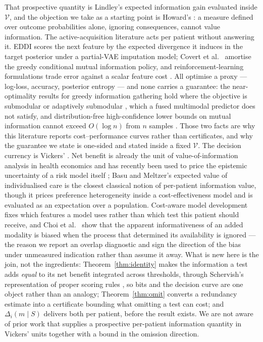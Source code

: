 \documentclass[11pt]{article}
\theoremstyle{definition}
\theoremstyle{remark}
\newcommand{\Vc}{\mathcal{V}}
\begin{document}
That prospective quantity is Lindley's expected information gain
\citep{lindley1956measure,chaloner1995bayesian} evaluated inside $\Vc$, and the
objection we take as a starting point is Howard's \citep{howard1966ivt}: a
measure defined over outcome probabilities alone, ignoring consequences, cannot
value information. The active-acquisition literature acts per patient without
answering it. EDDI \citep{ma2019eddi} scores the next feature by the expected
divergence it induces in the target posterior under a partial-VAE imputation
model; Covert et al.\ \citep{covert2023dfs} amortise the greedy conditional
mutual information policy, and reinforcement-learning formulations trade error
against a scalar feature cost \citep{janisch2019costly}. All optimise a proxy ---
log-loss, accuracy, posterior entropy --- and none carries a guarantee: the
near-optimality results for greedy information gathering hold where the objective
is submodular or adaptively submodular \citep{krause2005nearoptimal,
golovin2011adaptive}, which a fused multimodal predictor does not satisfy, and
distribution-free high-confidence lower bounds on mutual information cannot
exceed $O(\log n)$ from $n$ samples \citep{mcallester2020limitations}. Those two
facts are why this literature reports cost--performance curves rather than
certificates, and why the guarantee we state is one-sided and stated inside a
fixed $\Vc$. The decision currency is Vickers' \citep{vickers2006decision}. Net
benefit is already the unit of value-of-information analysis in health economics
\citep{ades2004evsi} and has recently been used to price the epistemic
uncertainty of a risk model itself \citep{sadatsafavi2022voi}; Basu and Meltzer's
expected value of individualised care \citep{basu2007evic} is the closest
classical notion of per-patient information value, though it prices preference
heterogeneity inside a cost-effectiveness model and is evaluated as an
expectation over a population. Cost-aware model development
\citep{erion2022coai} fixes which features a model uses rather than which test
this patient should receive, and Choi et al.\ \citep{choi2025icym2i} show that the
apparent informativeness of an added modality is biased when the process that
determined its availability is ignored --- the reason we report an overlap
diagnostic and sign the direction of the bias under unmeasured indication rather
than assume it away. What is new here is the join, not the ingredients:
Theorem~\ref{thm:identity} makes the information a test adds \emph{equal} to its
net benefit integrated across thresholds, through Schervish's representation of
proper scoring rules \citep{schervish1989general}, so bits and the decision curve
are one object rather than an analogy; Theorem~\ref{thm:omit} converts a
redundancy estimate into a certificate bounding what omitting a test can cost;
and $\Delta_i(m\mid S)$ delivers both per patient, before the result exists. We
are not aware of prior work that supplies a prospective per-patient information
quantity in Vickers' units together with a bound in the omission direction.
\end{document}
